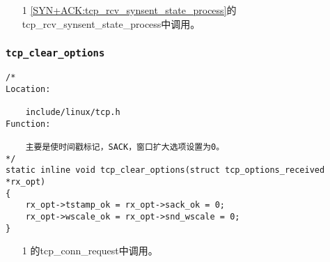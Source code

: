             \begin{enumerate}
                \item[1]        \ref{SYN+ACK:tcp_rcv_synsent_state_process}的tcp\_rcv\_synsent\_state\_process中调用。
            \end{enumerate}
        \subsubsection{\texttt{tcp_clear_options}}
            \label{TCPOptions:tcp_clear_options}
\begin{verbatim}
/*
Location:

    include/linux/tcp.h
Function:
    
    主要是使时间戳标记，SACK，窗口扩大选项设置为0。
*/
static inline void tcp_clear_options(struct tcp_options_received *rx_opt)
{
    rx_opt->tstamp_ok = rx_opt->sack_ok = 0;
    rx_opt->wscale_ok = rx_opt->snd_wscale = 0;
}
\end{verbatim}

            \begin{enumerate}
                \item[1]        \label{Server:tcp_conn_request}的tcp\_conn\_request中调用。
            \end{enumerate}
